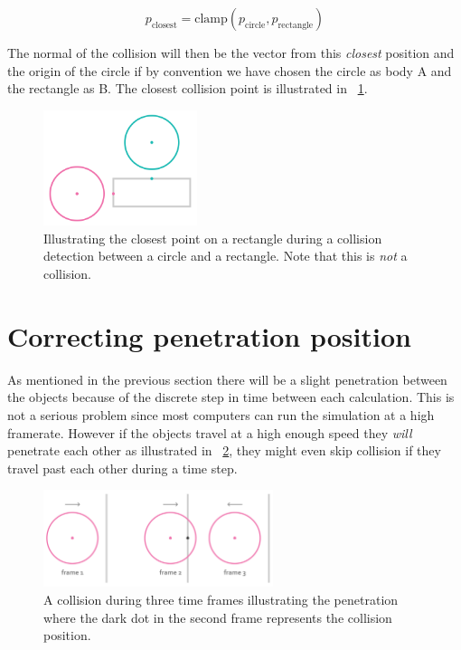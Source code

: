 \documentclass[a4paper,12pt]{report}
\begin{document}
\begin{equation}
p_{\text{closest}}=\text{clamp}( p_{\text{circle}}, p_{\text{rectangle}})
\label{eq:collision:2}
\end{equation}

The normal of the collision will then be the vector from this \emph{closest} position and the origin of the circle if by convention we have chosen the circle as body A and the rectangle as B. The closest collision point is illustrated in ~\ref{fig:closest}.

\begin{figure}[!ht]
    \centering
    \includegraphics[width=0.4\textwidth]{figures/closest.png}
    \caption{Illustrating the closest point on a rectangle during a collision detection between a circle and a rectangle. Note that this is \emph{not} a collision.}
    \label{fig:closest}
\end{figure}


\section{Correcting penetration position}

As mentioned in the previous section there will be a slight penetration between the objects because of the discrete step in time between each calculation. This is not a serious problem since most computers can run the simulation at a high framerate. However if the objects travel at a high enough speed they \emph{will} penetrate each other as illustrated in ~\ref{fig:penetration}, they might even skip collision if they travel past each other during a time step.

\begin{figure}[!ht]
    \centering
    \includegraphics[width=0.6\textwidth]{figures/penetration.png}
    \caption{A collision during three time frames illustrating the penetration  where the dark dot in the second frame represents the collision position.}
    \label{fig:penetration}
\end{figure}
\end{document}
